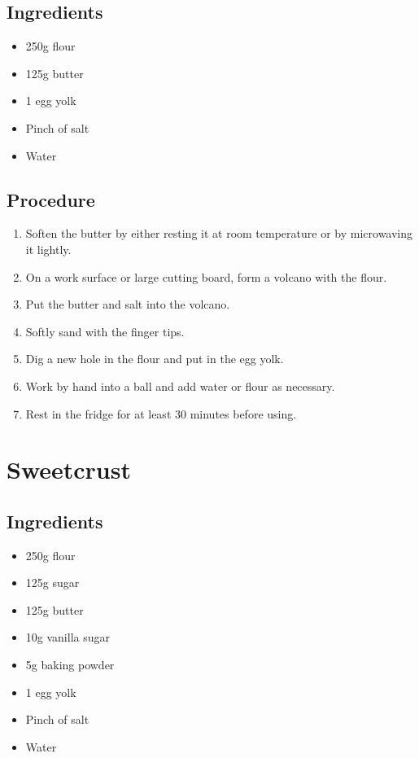 \documentclass[10pt]{book}
\begin{document}
\subsection*{Ingredients}
	\begin{itemize}
		\item 250g flour
		\item 125g butter
		\item 1 egg yolk
		\item Pinch of salt
		\item Water
	\end{itemize}
\subsection*{Procedure}
	\begin{enumerate}
		\item Soften the butter by either resting it at room temperature or by microwaving it lightly.
		\item On a work surface or large cutting board, form a volcano with the flour.
		\item Put the butter and salt into the volcano.
		\item Softly sand with the finger tips.
		\item Dig a new hole in the flour and put in the egg yolk.
		\item Work by hand into a ball and add water or flour as necessary.
		\item Rest in the fridge for at least 30 minutes before using.
	\end{enumerate}
\newpage

\newpage\section*{Sweetcrust}
\subsection*{Ingredients}
	\begin{itemize}
		\item 250g flour
		\item 125g sugar
		\item 125g butter
		\item 10g vanilla sugar
		\item 5g baking powder
		\item 1 egg yolk
		\item Pinch of salt
		\item Water
	\end{itemize}
\end{document}
